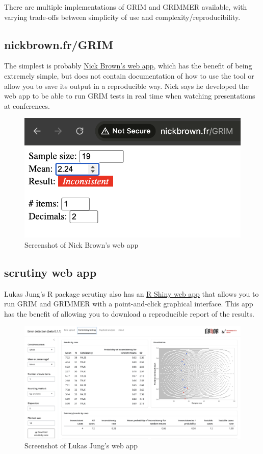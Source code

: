 \documentclass[letterpaper, 12pt]{article}
\begin{document}
{There are multiple implementations of GRIM and GRIMMER available, with varying trade-offs between simplicity of use and complexity/reproducibility. 

\subsection*{nickbrown.fr/GRIM}

The simplest is probably \href{http://nickbrown.fr/GRIM}{Nick Brown's web app}, which has the benefit of being extremely simple, but does not contain documentation of how to use the tool or allow you to save its output in a reproducible way. Nick says he developed the web app to be able to run GRIM tests in real time when watching presentations at conferences.  

\begin{figure}[h!]
    \centering
    \includegraphics[width=0.5\linewidth]{nickbrown's grim test.png}
    \caption{Screenshot of Nick Brown's web app}
\end{figure}

\subsection*{{scrutiny} web app}

Lukas Jung's R package {scrutiny} also has an \href{https://errors.shinyapps.io/scrutiny}{R Shiny web app} that allows you to run GRIM and GRIMMER with a point-and-click graphical interface. This app has the benefit of allowing you to download a reproducible report of the results.

\begin{figure}[h!]
    \centering
    \includegraphics[width=0.5\linewidth]{scrutiny web app.png}
    \caption{Screenshot of Lukas Jung's web app}
\end{figure}

}
\end{document}
